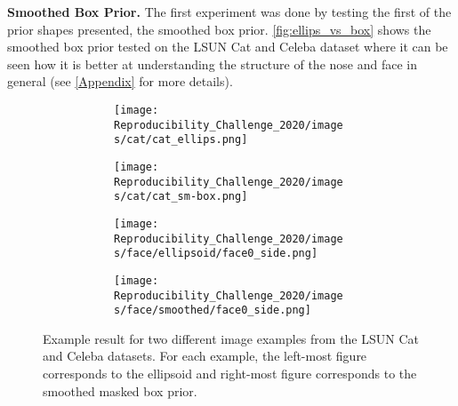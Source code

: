 \textbf{Smoothed Box Prior.}
The first experiment was done by testing the first of the prior shapes presented, the smoothed box prior. \autoref{fig:ellips_vs_box} shows the smoothed box prior tested on the LSUN Cat and Celeba dataset where it can be seen how it is better at understanding the structure of the nose and face in general (see \autoref{Appendix} for more details). \begin{figure}[!htb]
    \centering
    \begin{subfigure}{0.40\textwidth}
        \begin{subfigure}{0.48\textwidth}
            \centering
            \texttt{[image: Reproducibility\_Challenge\_2020/images/cat/cat\_ellips.png]}
        \end{subfigure}
        \begin{subfigure}{0.48\textwidth}
            \centering
            \texttt{[image: Reproducibility\_Challenge\_2020/images/cat/cat\_sm-box.png]}
        \end{subfigure}
    \end{subfigure}
    \begin{subfigure}{0.40\textwidth}
        \begin{subfigure}{0.48\textwidth}
            \centering
            \texttt{[image: Reproducibility\_Challenge\_2020/images/face/ellipsoid/face0\_side.png]}
        \end{subfigure}
        \begin{subfigure}{0.48\textwidth}
            \centering
            \texttt{[image: Reproducibility\_Challenge\_2020/images/face/smoothed/face0\_side.png]}
        \end{subfigure}
    \end{subfigure}
    \caption{Example result for two different image examples from the LSUN Cat and Celeba datasets. For each example, the left-most figure corresponds to the ellipsoid and right-most figure corresponds to the smoothed masked box prior.}
    \label{fig:ellips_vs_box}
\end{figure}


